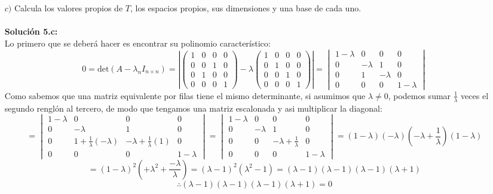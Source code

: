 \begin{itemize}
    \item [$c)$] Calcula los valores propios de $T$, los espacios propios, sus dimensiones y una base de cada uno.\\\\
    \textbf{Soluci\'on 5.c:}\\
    Lo primero que se deber\'a hacer es encontrar su polinomio caracter\'istico:
        \[0=\text{det}(A-\lambda_nI_{n\times n })=\left|\begin{pmatrix}
    1 & 0 & 0 & 0\\
    0 & 0 & 1 & 0\\
    0 & 1 & 0 & 0\\
    0 & 0 & 0 & 1\end{pmatrix}-\lambda\begin{pmatrix}
    1 & 0 & 0 & 0\\
    0 & 1 & 0 & 0\\
    0 & 0 & 1 & 0\\
    0 & 0 & 0 & 1\end{pmatrix}\right|=\begin{vmatrix}
    1-\lambda & 0 & 0 & 0\\
    0 & -\lambda & 1 & 0\\
    0 & 1 & -\lambda & 0\\
    0 & 0 & 0 & 1-\lambda\end{vmatrix}\] Como sabemos que una matriz equivalente por filas tiene el mismo determinante, si asumimos que $\lambda \neq 0$, podemos sumar $\displaystyle \frac{1}{\lambda}$ veces el segundo rengl\'on al tercero, de modo que tengamos una matriz escalonada y asi multiplicar la diagonal:
    \[=\begin{vmatrix}
    1-\lambda & 0 & 0 & 0\\
    0 & -\lambda & 1 & 0\\
    0 & 1+\frac{1}{\lambda}(-\lambda) & -\lambda+\frac{1}{\lambda}(1) & 0\\
    0 & 0 & 0 & 1-\lambda\end{vmatrix}=\begin{vmatrix}
    1-\lambda & 0 & 0 & 0\\
    0 & -\lambda & 1 & 0\\
    0 & 0 & -\lambda+\frac{1}{\lambda} & 0\\
    0 & 0 & 0 & 1-\lambda\end{vmatrix}=(1-\lambda)(-\lambda)\left(-\lambda+\frac{1}{\lambda}\right)(1-\lambda)\]\[=(1-\lambda)^2\left(+\lambda^2+\frac{-\lambda}{\lambda}\right)=(\lambda-1)^2(\lambda^2-1)=(\lambda-1)(\lambda-1)(\lambda-1)(\lambda+1)\]
    \[\therefore (\lambda-1)(\lambda-1)(\lambda-1)(\lambda+1)=0\]
    

\end{itemize}
